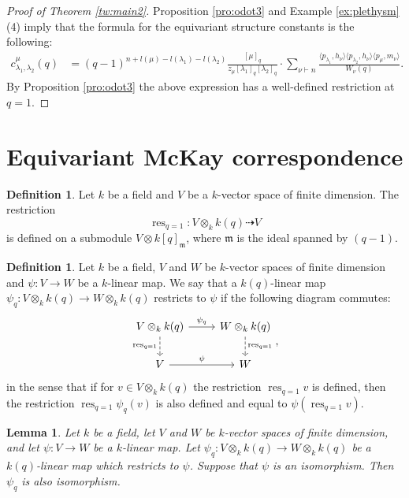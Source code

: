 \documentclass[12pt,a4paper]{amsart}
\theoremstyle{plain}
\newtheorem{lemma}[tw]{Lemma}
\theoremstyle{definition}
\newtheorem{df}[tw]{Definition}
\theoremstyle{remark}
\newcommand{\vv}{v}
\newcommand{\res}{\operatorname{res}}
\newcommand{\Partq}[1]{[{#1}]_q}
\begin{document}
\begin{proof}[Proof of Theorem \ref{tw:main2}]
	Proposition \ref{pro:odot3} and Example \ref{ex:plethysm} (4)
	imply that the formula for the equivariant structure constants is the following:
	\begin{align*}
		c^\mu_{\lambda_1,\lambda_2}(q)
		&=(q-1)^{n+l(\mu)-l(\lambda_1)-l(\lambda_2)}\frac{\Partq{\mu}}
		{z_\mu\Partq{\lambda_1}\Partq{\lambda_2}}\cdot\sum_{\nu\vdash n} \frac{\langle p_{\lambda_1},h_\nu\rangle\langle p_{\lambda_2},h_\nu\rangle\langle p_\mu,m_\nu\rangle}{W_\nu(q)}.
	\end{align*}
	By Proposition \ref{pro:odot3} the above expression has a well-defined restriction at $q=1$. 
\end{proof}

\appendix
\section{Equivariant McKay correspondence} \label{s:appendix}
\begin{df}
	Let $k$ be a field and $V$ be a $k$-vector space of finite dimension. The restriction
	$$\res_{q=1}\colon V\otimes_k k(q) \dashrightarrow V$$
	is defined on a submodule $V\otimes k[q]_\mathfrak{m}$, where $\mathfrak{m}$ is the ideal spanned by $(q-1)$.
\end{df}
\begin{df}
	Let $k$ be a field, $V$ and $W$ be $k$-vector spaces of finite dimension and $\psi:V\to W$ be a $k$-linear map. We say that a $k(q)$-linear map $\psi_q:V\otimes_k k(q)\to W\otimes_k k(q)$ restricts to $\psi$ if the following diagram commutes:
	$$
	\begin{tikzcd}
		{V\otimes_k k(q)} & {W\otimes_k k(q)} \\
		V & W
		\arrow["{\psi_q}", from=1-1, to=1-2]
		\arrow["\psi", from=2-1, to=2-2]
		\arrow["{\res_{q=1}}"', dashed, from=1-1, to=2-1]
		\arrow["{\res_{q=1}}", dashed, from=1-2, to=2-2]
	\end{tikzcd},
$$
in the sense that if for $\vv\in V\otimes_k k(q)$ the restriction $\res_{q=1}\vv$ is defined, then the restriction $\res_{q=1}\psi_q(\vv)$ is also defined and equal to $\psi(\res_{q=1}\vv)$.
\end{df}
\begin{lemma}
	Let $k$ be a field, let $V$ and $W$ be $k$-vector spaces of finite dimension, and let \hbox{$\psi:V\to W$} be a $k$-linear map. Let $\psi_q:V\otimes_k k(q)\to W\otimes_k k(q)$ be a $k(q)$-linear map which restricts to $\psi$. Suppose that $\psi$ is an isomorphism. Then $\psi_q$ is also isomorphism.
\end{lemma}
\end{document}
